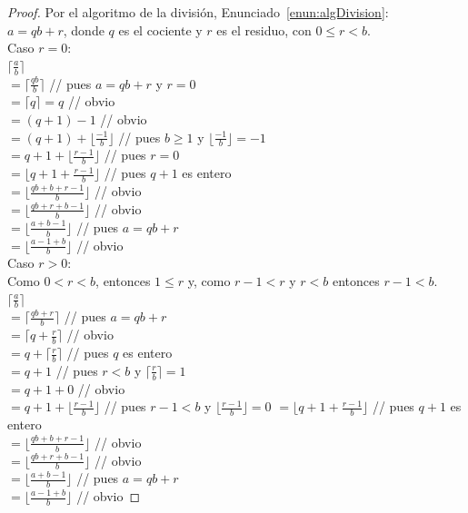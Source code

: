 \begin{proof}
Por el algoritmo de la división, Enunciado~\ref{enun:algDivision}:\\
$a = qb+r$, donde $q$ es el cociente y $r$ es el residuo, con $0 \leq r<b$.\\
Caso $r=0$:\\
$\lceil \frac{a}{b} \rceil$\\
$= \lceil \frac{qb}{b} \rceil$   \; \; \; \;  \; \; \; \; \; \; \; \;  // pues $a = qb+r$ y $r=0$\\
$= \lceil q \rceil = q$ \; \; \; \;  \; \; \; \; \; \;  // obvio\\
$= (q+1)-1$ \; \; \;  \; \; \; \;  // obvio \\
$= (q+1)+ \lfloor \frac{-1}{b} \rfloor$ \; \; \; \; //  pues $b \geq 1$ y $\lfloor \frac{-1}{b} \rfloor= -1$ \\
$= q+1+ \lfloor \frac{r-1}{b} \rfloor$ \; \; \; \;  \; //  pues $r=0$ \\
$=  \lfloor q+1+ \frac{r-1}{b} \rfloor$ \; \; \; \; \; // pues $q+1$ es entero \\
$=  \lfloor \frac{qb+b+ r -1}{b} \rfloor$  \; \; \; \;  \; \; \; \;  // obvio \\
$=  \lfloor \frac{qb+r+b-1}{b} \rfloor$ \; \; \; \;  \; \; \; \;  // obvio \\
$=  \lfloor \frac{a+b -1}{ b} \rfloor$ \; \; \; \;  \; \; \; \; \; \;  // pues  $a = qb+r$ \\
$=  \lfloor \frac{a-1+b}{b} \rfloor$ \; \; \; \; \; \;  \; \; \; \;   // obvio \\
Caso $r>0$:\\
Como $0<r<b$, entonces $1 \leq r$ y, como $r-1<r$ y $r<b$ entonces $r-1<b$.\\
$\lceil \frac{a}{b} \rceil$\\
$= \lceil \frac{qb+r}{b} \rceil$ \; \; \;  \; \; \; \; \; \; \; \;  // pues $a = qb+r$\\
$= \lceil q+ \frac{r}{b} \rceil$   \; \; \; \; \; \; \; \; \; \; // obvio \\
$= q+ \lceil \frac{r}{b} \rceil$ \; \; \; \; \; \; \; // pues $q$ es entero \\
$= q+1$  \; \; \; \; \; \; \; \; \; // pues $r<b$ y $\lceil \frac{r}{b} \rceil = 1$ \\
$= q+1+0$ \; \; \; \; \; \; // obvio \\
$= q+1+ \lfloor \frac{r-1}{b} \rfloor$ \; \; \; // pues  $r-1<b$ y $\lfloor \frac{r-1}{b} \rfloor = 0$
$=  \lfloor q+1+ \frac{r-1}{b} \rfloor$ \; \; \; // pues $q+1$ es entero \\
$=  \lfloor \frac{qb+b+ r -1}{b} \rfloor$  \; \; \; \;  \;  // obvio \\
$=  \lfloor \frac{qb+r+b-1}{b} \rfloor$ \; \; \; \; \;  // obvio \\
$=  \lfloor \frac{a+b -1}{ b} \rfloor$ \; \; \; \;  \; \; \;  // pues  $a = qb+r$ \\
$=  \lfloor \frac{a-1+b}{b} \rfloor$ \; \; \; \; \; \; \;   // obvio
\end{proof}

